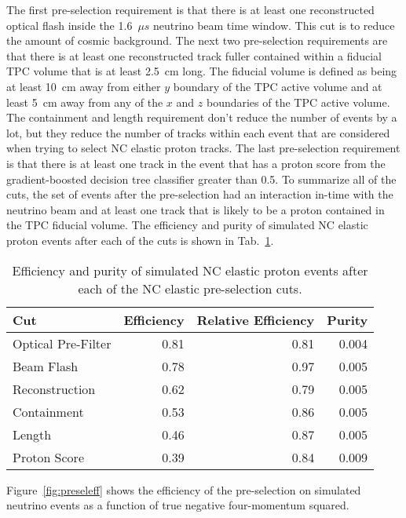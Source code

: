     The first pre-selection requirement is that there is at least one
    reconstructed optical flash inside the 1.6~$\mu s$ neutrino beam time
    window. This cut is to reduce the amount of cosmic background. The next two
    pre-selection requirements are that there is at least one reconstructed
    track fuller contained within a fiducial TPC volume that is at least 2.5~cm
    long. The fiducial volume is defined as being at least 10~cm away from
    either $y$ boundary of the TPC active volume and at least 5~cm away from
    any of the $x$ and $z$ boundaries of the TPC active volume. The containment
    and length requirement don't reduce the number of events by a lot, but they
    reduce the number of tracks within each event that are considered when
    trying to select NC elastic proton tracks. The last pre-selection
    requirement is that there is at least one track in the event that has a
    proton score from the gradient-boosted decision tree classifier greater
    than 0.5. To summarize all of the cuts, the set of events after the
    pre-selection had an interaction in-time with the neutrino beam and at
    least one track that is likely to be a proton contained in the TPC fiducial
    volume.  The efficiency and purity of simulated NC elastic proton events
    after each of the cuts is shown in Tab.~\ref{tab:preseleff}.
    \begin{table}
      \caption{Efficiency and purity of simulated NC elastic proton events
        after each of the NC elastic pre-selection cuts.
      \label{tab:preseleff}}
      \begin{tabularx}{\textwidth}{l r r r}
        \hline
        Cut & Efficiency & Relative Efficiency & Purity \\
        \hline
        Optical Pre-Filter & 0.81 & 0.81 & 0.004 \\
        Beam Flash & 0.78 & 0.97 & 0.005 \\
        Reconstruction & 0.62 & 0.79 & 0.005 \\
        Containment & 0.53 & 0.86 & 0.005 \\
        Length & 0.46 & 0.87 & 0.005 \\
        Proton Score & 0.39 & 0.84 & 0.009 \\
        \hline
      \end{tabularx}
    \end{table}
    Figure~\ref{fig:preseleff} shows the efficiency of the pre-selection on
    simulated neutrino events as a function of true negative four-momentum
    squared.
